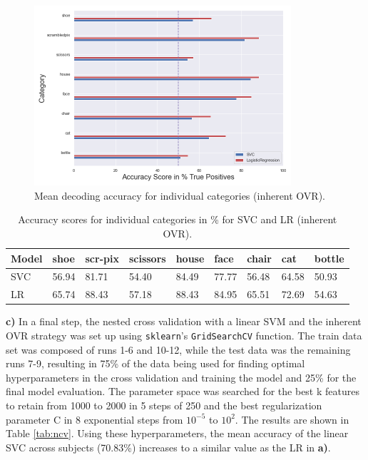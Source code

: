 \documentclass[11pt, a4paper]{article}
\begin{document}
\begin{figure}[hbt!]
\centering
\includegraphics[width=0.85\textwidth]{ind_classes.png}
\caption{Mean decoding accuracy for individual categories (inherent OVR).}
\label{fig:ind_cl}
\end{figure}
\begin{table}[hbt!]
\centering
\caption{Accuracy scores for individual categories in \% for SVC and LR (inherent OVR).}
\begin{tabular}{||l||l|l|l|l|l|l|l|l||}
\cline{1-9}
Model  & \multicolumn{1}{l|}{shoe} & \multicolumn{1}{l|}{scr-pix} & \multicolumn{1}{l|}{scissors} & \multicolumn{1}{l|}{house} & \multicolumn{1}{l|}{face} & \multicolumn{1}{l|}{chair} & \multicolumn{1}{l|}{cat} & bottle \\ \hline \hline
SVC    & 56.94                     & 81.71                        & 54.40                         & 84.49                      & 77.77                     & 56.48                      & 64.58                    & 50.93  \\ %
LR & 65.74                     & 88.43                        & 57.18                         & 88.43                      & 84.95                     & 65.51                      & 72.69                    & 54.63  \\ \cline{1-9}
\end{tabular}
\label{tab:cat_score}
\end{table}
\textbf{c)} In a final step, the nested cross validation with a linear SVM and the inherent OVR strategy was set up using \verb|sklearn|'s \verb|GridSearchCV| function. The train data set was composed of runs 1-6 and 10-12, while the test data was the remaining runs 7-9, resulting in 75\% of the data being used for finding optimal hyperparameters in the cross validation and training the model and 25\% for the final model evaluation. The parameter space was searched for the best k features to retain from 1000 to 2000 in 5 steps of 250 and the best regularization parameter C in 8 exponential steps from $10^{-5}$ to $10^2$. The results are shown in Table \ref{tab:ncv}. Using these hyperparameters, the mean accuracy of the linear SVC across subjects (70.83\%) increases to a similar value as the LR in \textbf{a)}.
\end{document}
